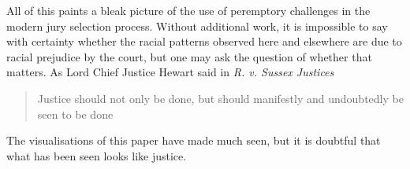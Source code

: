 \documentclass[12pt]{article}
\begin{document}
All of this paints a bleak picture of the use of peremptory challenges in the modern jury selection process. Without additional work, it is impossible to say with certainty whether the racial patterns observed here and elsewhere are due to racial prejudice by the court, but one may ask the question of whether that matters. As Lord Chief Justice Hewart said in \textit{R. v. Sussex Justices}

\begin{quote}
  Justice should not only be done, but should manifestly and undoubtedly be seen to be done
\end{quote}

The visualisations of this paper have made much seen, but it is doubtful that what has been seen looks like justice.





\end{document}
